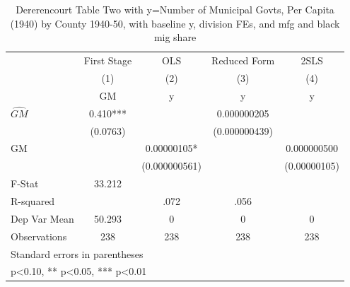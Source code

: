 \begin{table}[htbp]\centering
\def\sym#1{\ifmmode^{#1}\else\(^{#1}\)\fi}
\caption{Dererencourt Table Two with y=Number of Municipal Govts, Per Capita (1940) by County 1940-50, with baseline y, division FEs, and mfg and black mig share}
\begin{tabular}{l*{4}{c}}
\toprule
                    & First Stage   &         OLS   &Reduced Form   &        2SLS   \\
                    &\multicolumn{1}{c}{(1)}&\multicolumn{1}{c}{(2)}&\multicolumn{1}{c}{(3)}&\multicolumn{1}{c}{(4)}\\
                    &\multicolumn{1}{c}{GM}&\multicolumn{1}{c}{y}&\multicolumn{1}{c}{y}&\multicolumn{1}{c}{y}\\
\midrule
$\hat{GM}$          &       0.410***&               & 0.000000205   &               \\
                    &    (0.0763)   &               &(0.000000439)   &               \\
\addlinespace
GM                  &               &  0.00000105*  &               & 0.000000500   \\
                    &               &(0.000000561)   &               &(0.00000105)   \\
\midrule
F-Stat              &      33.212   &               &               &               \\
R-squared           &               &        .072   &        .056   &               \\
Dep Var Mean        &      50.293   &           0   &           0   &           0   \\
Observations        &         238   &         238   &         238   &         238   \\
\bottomrule
\multicolumn{5}{l}{\footnotesize Standard errors in parentheses}\\
\multicolumn{5}{l}{\footnotesize * p<0.10, ** p<0.05, *** p<0.01}\\
\end{tabular}
\end{table}
